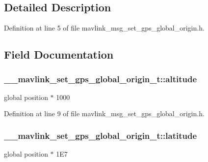 \subsection{Detailed Description}


Definition at line 5 of file mavlink\-\_\-msg\-\_\-set\-\_\-gps\-\_\-global\-\_\-origin.\-h.



\subsection{Field Documentation}
\hypertarget{struct____mavlink__set__gps__global__origin__t_ae86e137844aafd0a7fc6502b355cd0a2}{
\subsubsection[{altitude}]{ \-\_\-\-\_\-mavlink\-\_\-set\-\_\-gps\-\_\-global\-\_\-origin\-\_\-t\-::altitude}}\label{struct____mavlink__set__gps__global__origin__t_ae86e137844aafd0a7fc6502b355cd0a2}


global position $\ast$ 1000 



Definition at line 9 of file mavlink\-\_\-msg\-\_\-set\-\_\-gps\-\_\-global\-\_\-origin.\-h.

\hypertarget{struct____mavlink__set__gps__global__origin__t_aae0adf1cfbd99eef18d9d43fdb0418dd}{
\subsubsection[{latitude}]{ \-\_\-\-\_\-mavlink\-\_\-set\-\_\-gps\-\_\-global\-\_\-origin\-\_\-t\-::latitude}}\label{struct____mavlink__set__gps__global__origin__t_aae0adf1cfbd99eef18d9d43fdb0418dd}


global position $\ast$ 1\-E7 



